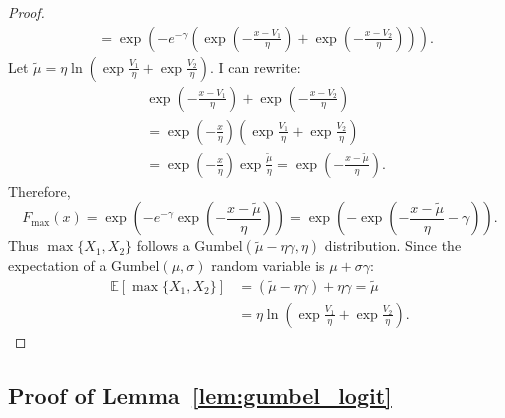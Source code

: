 \documentclass[12pt]{article}
\theoremstyle{plain}
\begin{document}
\begin{proof}
\begin{align*}
		            & = \exp\left(-e^{-\gamma}\left(\exp\left(-\frac{x - V_1}{\eta}\right) + \exp\left(-\frac{x - V_2}{\eta}\right)\right)\right).
	\end{align*}
	Let $\tilde{\mu} = \eta \ln\left(\exp\frac{V_1}{\eta} +
		\exp\frac{V_2}{\eta}\right)$. I can rewrite:
	\begin{align*}
		 & \exp\left(-\frac{x - V_1}{\eta}\right) + \exp\left(-\frac{x - V_2}{\eta}\right)                                   \\
		 & = \exp\left(-\frac{x}{\eta}\right)\left(\exp\frac{V_1}{\eta} + \exp\frac{V_2}{\eta}\right)                        \\
		 & = \exp\left(-\frac{x}{\eta}\right) \exp\frac{\tilde{\mu}}{\eta} = \exp\left(-\frac{x - \tilde{\mu}}{\eta}\right).
	\end{align*}
	Therefore,
	\begin{equation*}
		F_{\max}(x) = \exp\left(-e^{-\gamma}\exp\left(-\frac{x - \tilde{\mu}}{\eta}\right)\right) = \exp\left(-\exp\left(-\frac{x - \tilde{\mu}}{\eta} - \gamma\right)\right).
	\end{equation*}
	Thus $\max\{X_1, X_2\}$ follows a Gumbel$(\tilde{\mu} - \eta\gamma, \eta)$
	distribution. Since the expectation of a Gumbel$(\mu, \sigma)$ random variable
	is $\mu + \sigma\gamma$:
	\begin{align*}
		\mathbb{E}[\max\{X_1, X_2\}] & = (\tilde{\mu} - \eta\gamma) + \eta\gamma = \tilde{\mu}             \\
		                             & = \eta \ln\left(\exp\frac{V_1}{\eta} + \exp\frac{V_2}{\eta}\right).
	\end{align*}
\end{proof}

\subsection{Proof of Lemma~\ref{lem:gumbel_logit}}\label{app:proof_gumbel_logit}
\end{document}
